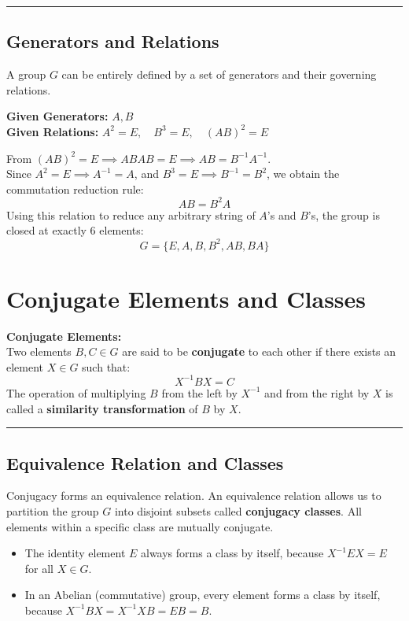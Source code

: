 \documentclass[11pt, a4paper]{report}
\begin{document}
\vspace{1em}
\hrule
\vspace{1em}

\subsection*{Generators and Relations}

A group $G$ can be entirely defined by a set of generators and their governing relations. 

\textbf{Given Generators:} $A, B$ \\
\textbf{Given Relations:} $A^2 = E, \quad B^3 = E, \quad (AB)^2 = E$

From $(AB)^2 = E \implies ABAB = E \implies AB = B^{-1}A^{-1}$. \\
Since $A^2 = E \implies A^{-1} = A$, and $B^3 = E \implies B^{-1} = B^2$, we obtain the commutation reduction rule:
\[ AB = B^2A \]
Using this relation to reduce any arbitrary string of $A$'s and $B$'s, the group is closed at exactly 6 elements:
\[ G = \{E, A, B, B^2, AB, BA\} \]

\section{Conjugate Elements and Classes}

\textbf{Conjugate Elements:} \\
Two elements $B, C \in G$ are said to be \textbf{conjugate} to each other if there exists an element $X \in G$ such that:
\[ X^{-1} B X = C \]
The operation of multiplying $B$ from the left by $X^{-1}$ and from the right by $X$ is called a \textbf{similarity transformation} of $B$ by $X$.

\vspace{1em}
\hrule
\vspace{1em}

\subsection*{Equivalence Relation and Classes}
Conjugacy forms an equivalence relation. An equivalence relation allows us to partition the group $G$ into disjoint subsets called \textbf{conjugacy classes}. All elements within a specific class are mutually conjugate. 
\begin{itemize}
    \item The identity element $E$ always forms a class by itself, because $X^{-1} E X = E$ for all $X \in G$.
    \item In an Abelian (commutative) group, every element forms a class by itself, because $X^{-1} B X = X^{-1} X B = E B = B$.
\end{itemize}
\end{document}
